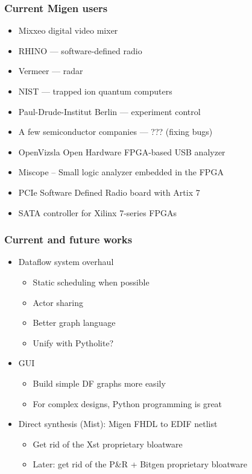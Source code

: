 \documentclass{beamer}
\begin{document}
\begin{frame}
\frametitle{Current Migen users}
\begin{itemize}
\item Mixxeo digital video mixer
\item RHINO --- software-defined radio
\item Vermeer --- radar
\item NIST --- trapped ion quantum computers
\item Paul-Drude-Institut Berlin --- experiment control
\item A few semiconductor companies --- ??? (fixing bugs)
\item OpenVizsla Open Hardware FPGA-based USB analyzer
\item Miscope -- Small logic analyzer embedded in the FPGA
\item PCIe Software Defined Radio board with Artix 7
\item SATA controller for Xilinx 7-series FPGAs
\end{itemize}
\end{frame}

\begin{frame}
\frametitle{Current and future works}
\begin{itemize}
\item Dataflow system overhaul
\begin{itemize}
\item Static scheduling when possible
\item Actor sharing
\item Better graph language
\item Unify with Pytholite?
\end{itemize}
\item GUI
\begin{itemize}
\item Build simple DF graphs more easily
\item For complex designs, Python programming is great
\end{itemize}
\item Direct synthesis (Mist): Migen FHDL to EDIF netlist
\begin{itemize}
\item Get rid of the Xst proprietary bloatware
\item Later: get rid of the P\&R + Bitgen proprietary bloatware
\end{itemize}
\end{itemize}
\end{frame}
\end{document}
